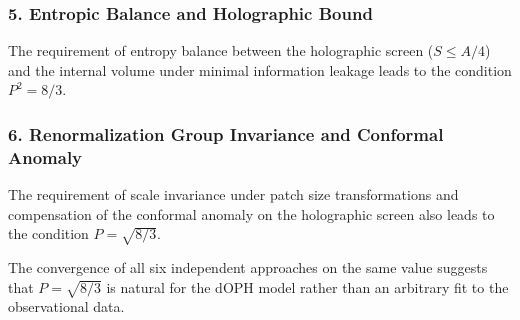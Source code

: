 \documentclass[11pt,a4paper]{article}
\begin{document}
\subsubsection{5. Entropic Balance and Holographic Bound}
The requirement of entropy balance between the holographic screen (\( S \leq A/4 \)) 
and the internal volume under minimal information leakage leads to the condition 
\( P^2 = 8/3 \).

\subsubsection{6. Renormalization Group Invariance and Conformal Anomaly}
The requirement of scale invariance under patch size transformations and compensation 
of the conformal anomaly on the holographic screen also leads to the condition 
\( P = \sqrt{8/3} \).

The convergence of all six independent approaches on the same value suggests that 
\( P = \sqrt{8/3} \) is natural for the dOPH model rather than an arbitrary fit to 
the observational data.
\end{document}
